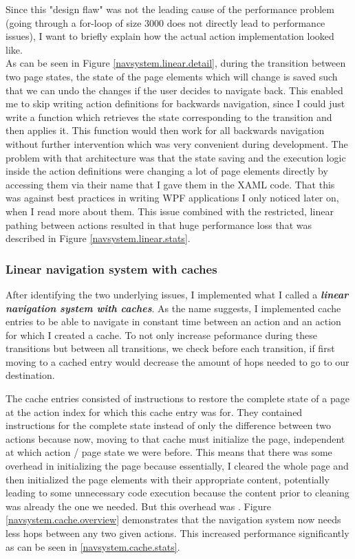 \par

Since this "design flaw" was not the leading cause of the performance problem (going through a for-loop of size 3000 does not directly lead to performance issues), I want to briefly explain how the actual action implementation looked like.\\
As can be seen in Figure \ref{navsystem.linear.detail}, during the transition between two page states, the state of the page elements which will change is saved such that we can undo the changes if the user decides to navigate back. This enabled me to skip writing action definitions for backwards navigation, since I could just write a function which retrieves the state corresponding to the transition and then applies it. This function would then work for all backwards navigation without further intervention which was very convenient during development.
The problem with that architecture was that the state saving and the execution logic inside the action definitions were changing a lot of page elements directly by accessing them via their name that I gave them in the XAML code. That this was against best practices in writing WPF applications I only noticed later on, when I read more about them. This issue combined with the restricted, linear pathing between actions resulted in that huge performance loss that was described in Figure \ref{navsystem.linear.stats}.

\subsubsection{Linear navigation system with caches}

After identifying the two underlying issues, I implemented what I called a \textbf{\textit{linear navigation system with caches}}. As the name suggests, I implemented cache entries to be able to navigate in constant time between an action and an action for which I created a cache. To not only increase peformance during these transitions but between all transitions, we check before each transition, if first moving to a cached entry would decrease the amount of hops needed to go to our destination.

\par

The cache entries consisted of instructions to restore the complete state of a page at the action index for which this cache entry was for. They contained instructions for the complete state instead of only the difference between two actions because now, moving to that cache must initialize the page, independent at which action / page state we were before. This means that there was some overhead in initializing the page because essentially, I cleared the whole page and then initialized the page elements with their appropriate content, potentially leading to some unnecessary code execution because the content prior to cleaning was already the one we needed. But this overhead was . Figure \ref{navsystem.cache.overview} demonstrates that the navigation system now needs less hops between any two given actions. This increased performance significantly as can be seen in \ref{navsystem.cache.stats}. \par

